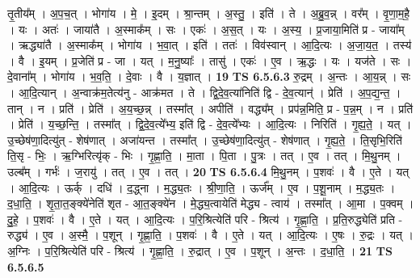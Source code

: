 \documentclass[17pt]{extarticle}
\begin{document}
                  तृ॒तीय᳚म् । अ॒प॒च॒त् । भोगा॑य । मे॒ । इ॒दम् । श्रा॒न्तम् । अ॒स्तु॒ । इति॑ । ते । अ॒ब्रु॒व॒न्न् । वर᳚म् । वृ॒णा॒म॒है॒ । यः । अतः॑ । जाया॑तै । अ॒स्माक᳚म् । सः । एकः॑ । अ॒स॒त् । यः । अ॒स्य॒ । प्र॒जाया॒मिति॑ प्र - जाया᳚म् । ऋद्ध्या॑तै । अ॒स्माक᳚म् । भोगा॑य । भ॒वा॒त् । इति॑ । ततः॑ । विव॑स्वान् । आ॒दि॒त्यः । अ॒जा॒य॒त॒ । तस्य॑ । वै । इ॒यम् । प्र॒जेति॑ प्र - जा । यत् । म॒नु॒ष्याः᳚ । तासु॑ । एकः॑ । ए॒व । ऋ॒द्धः । यः । यज॑ते । सः । दे॒वाना᳚म् । भोगा॑य । भ॒व॒ति॒ । दे॒वाः । वै । य॒ज्ञात् । \textbf{  19} \newline
                  \newline
                                \textbf{ TS 6.5.6.3} \newline
                  रु॒द्रम् । अ॒न्तः । आ॒य॒न्न् । सः । आ॒दि॒त्यान् । अ॒न्वाक्र॑म॒तेत्य॑नु - आक्र॑मत । ते । द्वि॒दे॒व॒त्या॑निति॑ द्वि - दे॒व॒त्यान्॑ । प्रेति॑ । अ॒प॒द्य॒न्त॒ । तान् । न । प्रति॑ । प्रेति॑ । अ॒य॒च्छ॒न्न् । तस्मा᳚त् । अपीति॑ । वद्ध्य᳚म् । प्रप॑न्न॒मिति॒ प्र - प॒न्न॒म् । न । प्रति॑ । प्रेति॑ । य॒च्छ॒न्ति॒ । तस्मा᳚त् । द्वि॒दे॒व॒त्ये᳚भ्य॒ इति॑ द्वि - दे॒व॒त्ये᳚भ्यः । आ॒दि॒त्यः । निरिति॑ । गृ॒ह्य॒ते॒ । यत् । उ॒च्छेष॑णा॒दित्यु॑त् - शेष॑णात् । अजा॑यन्त । तस्मा᳚त् । उ॒च्छेष॑णा॒दित्यु॑त् - शेष॑णात् । गृ॒ह्य॒ते॒ । ति॒सृभि॒रिति॑ ति॒सृ - भिः॒ । ऋ॒ग्भिरित्यृ॑क् - भिः । गृ॒ह्णा॒ति॒ । मा॒ता । पि॒ता । पु॒त्रः । तत् । ए॒व । तत् । मि॒थु॒नम् । उल्ब᳚म् । गर्भः॑ । ज॒रायु॑ । तत् । ए॒व । तत् । \textbf{  20} \newline
                  \newline
                                \textbf{ TS 6.5.6.4} \newline
                  मि॒थु॒नम् । प॒शवः॑ । वै । ए॒ते । यत् । आ॒दि॒त्यः । ऊर्क् । दधि॑ । द॒द्ध्ना । म॒द्ध्य॒तः । श्री॒णा॒ति॒ । ऊर्ज᳚म् । ए॒व । प॒शू॒नाम् । म॒द्ध्य॒तः । द॒धा॒ति॒ । शृ॒ता॒त॒ङ्क्ये॑नेति॑ शृत - आ॒त॒ङ्क्ये॑न । मे॒द्ध्य॒त्वायेति॑ मेद्ध्य - त्वाय॑ । तस्मा᳚त् । आ॒मा । प॒क्वम् । दु॒हे॒ । प॒शवः॑ । वै । ए॒ते । यत् । आ॒दि॒त्यः । प॒रि॒श्रित्येति॑ परि - श्रित्य॑ । गृ॒ह्णा॒ति॒ । प्र॒ति॒रुद्ध्येति॑ प्रति - रुद्ध्य॑ । ए॒व । अ॒स्मै॒ । प॒शून् । गृ॒ह्णा॒ति॒ । प॒शवः॑ । वै । ए॒ते । यत् । आ॒दि॒त्यः । ए॒षः । रु॒द्रः । यत् । अ॒ग्निः । प॒रि॒श्रित्येति॑ परि - श्रित्य॑ । गृ॒ह्णा॒ति॒ । रु॒द्रात् । ए॒व । प॒शून् । अ॒न्तः । द॒धा॒ति॒ । \textbf{  21} \newline
                  \newline
                                \textbf{ TS 6.5.6.5} \newline
\end{document}
